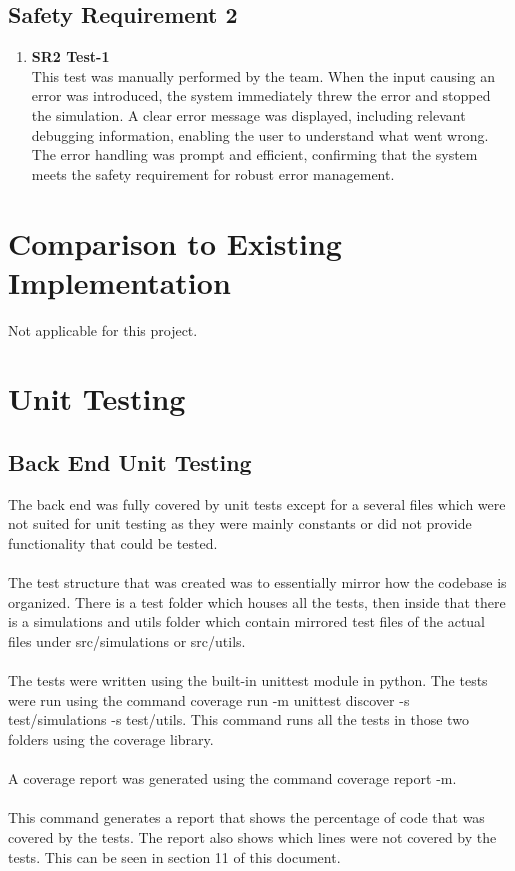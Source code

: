 \documentclass[12pt, titlepage]{article}
\begin{document}
\subsection{Safety Requirement 2}
  \begin{enumerate}
    \item {\textbf{SR2 Test-1}}\\
    This test was manually performed by the team. When the input causing an error was introduced, the system immediately threw the error and stopped the simulation. A clear error message was displayed, including relevant debugging information, enabling the user to understand what went wrong. The error handling was prompt and efficient, confirming that the system meets the safety requirement for robust error management.
    \end{enumerate}

\section{Comparison to Existing Implementation}	

Not applicable for this project.
\section{Unit Testing}

\subsection{Back End Unit Testing}
The back end was fully covered by unit tests except for a several files which were not suited for unit testing as they were mainly constants or did not provide functionality that could be tested. \\
\\
The test structure that was created was to essentially mirror how the codebase is organized. There is a test folder which houses all the tests, then inside that there is a simulations and utils folder which contain mirrored test files of the actual files under src/simulations or src/utils.\\
\\
The tests were written using the built-in unittest module in python. The tests were run using the command coverage run -m unittest discover -s test/simulations -s test/utils. This command runs all the tests in those two folders using the coverage library.\\
\\
A coverage report was generated using the command coverage report -m.\\
\\
This command generates a report that shows the percentage of code that was covered by the tests. The report also shows which lines were not covered by the tests.
This can be seen in section 11 of this document.\\
\end{document}
